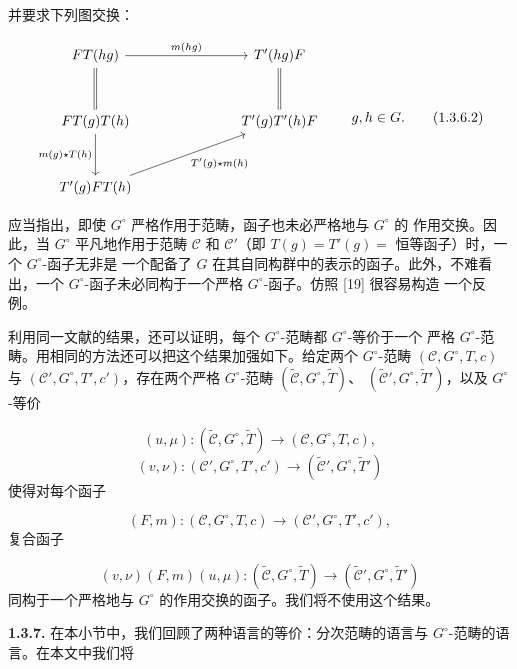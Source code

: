 \clearpage
{}%
并要求下列图交换：

\begin{equation}
  \begin{tikzcd}[column sep=7em,row sep=3em]
    FT(hg) \arrow[r,"m(hg)"] \arrow[d,equal] &
      T'(hg)F \arrow[d,equal] \\
    FT(g)T(h) \arrow[d,"m(g)\mathbin{\star}T(h)"'] &
      T'(g)T'(h)F \\
    T'(g)FT(h) \arrow[ur,"T'(g)\mathbin{\star}m(h)"'] &
  \end{tikzcd}
  \qquad g,h\in G.
  \tag{1.3.6.2}
\end{equation}

应当指出，即使 $G^\circ$ 严格作用于范畴，函子也未必严格地与 $G^\circ$ 的
作用交换。因此，当 $G^\circ$ 平凡地作用于范畴 $\mathcal C$ 和
$\mathcal C'$（即 $T(g)=T'(g)=$ 恒等函子）时，一个 $G^\circ$-函子无非是
一个配备了 $G$ 在其自同构群中的表示的函子。此外，不难看出，一个
$G^\circ$-函子未必同构于一个严格 $G^\circ$-函子。仿照 [19] 很容易构造
一个反例。

利用同一文献的结果，还可以证明，每个 $G^\circ$-范畴都 $G^\circ$-等价于一个
严格 $G^\circ$-范畴。用相同的方法还可以把这个结果加强如下。给定两个
$G^\circ$-范畴 $(\mathcal C,G^\circ,T,c)$ 与
$(\mathcal C',G^\circ,T',c')$，存在两个严格 $G^\circ$-范畴
$(\widetilde{\mathcal C},G^\circ,\widetilde T)$、
$(\widetilde{\mathcal C}',G^\circ,\widetilde T')$，以及 $G^\circ$-等价

\[
  (u,\mu)\colon
  (\widetilde{\mathcal C},G^\circ,\widetilde T)
  \longrightarrow
  (\mathcal C,G^\circ,T,c),
\]
\[
  (v,\nu)\colon
  (\mathcal C',G^\circ,T',c')
  \longrightarrow
  (\widetilde{\mathcal C}',G^\circ,\widetilde T')
\]
使得对每个函子

\[
  (F,m)\colon
  (\mathcal C,G^\circ,T,c)
  \longrightarrow
  (\mathcal C',G^\circ,T',c'),
\]
复合函子

\[
  (v,\nu)(F,m)(u,\mu)\colon
  (\widetilde{\mathcal C},G^\circ,\widetilde T)
  \longrightarrow
  (\widetilde{\mathcal C}',G^\circ,\widetilde T')
\]
同构于一个严格地与 $G^\circ$ 的作用交换的函子。我们将不使用这个结果。

\noindent\textbf{1.3.7.}\quad
在本小节中，我们回顾了两种语言的等价：分次范畴的语言与
$G^\circ$-范畴的语言。在本文中我们将
